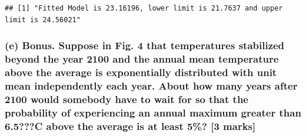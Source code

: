 \documentclass[]{article}
\begin{document}
\begin{verbatim}
## [1] "Fitted Model is 23.16196, lower limit is 21.7637 and upper limit is 24.56021"
\end{verbatim}

\subsubsection{(e) Bonus. Suppose in Fig. 4 that temperatures stabilized
beyond the year 2100 and the annual mean temperature above the average
is exponentially distributed with unit mean independently each year.
About how many years after 2100 would somebody have to wait for so that
the probability of experiencing an annual maximum greater than 6.5???C
above the average is at least 5\%? {[}3
marks{]}}\label{e-bonus.-suppose-in-fig.-4-that-temperatures-stabilized-beyond-the-year-2100-and-the-annual-mean-temperature-above-the-average-is-exponentially-distributed-with-unit-mean-independently-each-year.-about-how-many-years-after-2100-would-somebody-have-to-wait-for-so-that-the-probability-of-experiencing-an-annual-maximum-greater-than-6.5c-above-the-average-is-at-least-5-3-marks}
\end{document}
